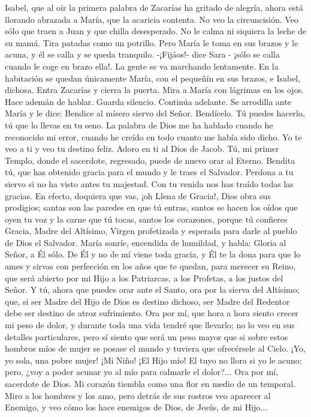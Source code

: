 \documentclass[12pt]{book} %
\begin{document}
Isabel, que al oír la primera palabra de Zacarías ha gritado de alegría, ahora está llorando abrazada a María, que la 
acaricia contenta. 
No veo la circuncisión. Veo sólo que traen a Juan y que chilla desesperado. No le calma ni siquiera la leche de su mamá. Tira patadas como un potrillo. Pero María le toma en sus brazos y le acuna, y él se calla y se queda tranquilo. 
-¡Fijáos!- dice Sara - ¡sólo se calla cuando le coge en brazo ella!. 
La gente se va marchando lentamente. En la habitación se quedan únicamente María, con el pequeñín en sus brazos, e Isabel, dichosa. 
Entra Zacarías y cierra la puerta. Mira a María con lágrimas en los ojos. Hace ademán de hablar. Guarda silencio. Continúa adelante. Se arrodilla ante María y le dice: 
Bendice al mísero siervo del Señor. Bendícelo. Tú puedes hacerlo, tú que lo llevas en tu seno. La palabra de Dios me ha hablado cuando he reconocido mi error, cuando he creído en todo cuanto me había sido dicho. Yo te veo a ti y veo tu destino feliz. Adoro en ti al Dios de Jacob. Tú, mi primer Templo, donde el sacerdote, regresado, puede de nuevo orar al Eterno. Bendita tú, que has obtenido gracia para el mundo y le traes el Salvador. Perdona a tu siervo si no ha visto antes tu majestad. Con tu venida nos has traído todas las gracias. En efecto, doquiera que vas, ¡oh Llena de Gracia!, Dios obra sus prodigios; santas son las paredes en que tú entras, santos se hacen los oídos que oyen tu voz y la carne que tú tocas, santos los corazones, porque tú confieres Gracia, Madre del Altísimo, Virgen profetizada y esperada para darle al pueblo de Dios el Salvador. 
María sonríe, encendida de humildad, y habla: 
Gloria al Señor, a Él sólo. De Él y no de mí viene toda gracia, y Él te la dona para que lo ames y sirvas con perfección en 
los años que te quedan, para merecer su Reino, que será abierto por mi Hijo a los Patriarcas, a los Profetas, a los justos del Señor. Y tú, ahora que puedes orar ante el Santo, ora por la sierva del Altísimo; que, si ser Madre del Hijo de Dios es destino dichoso, ser Madre del Redentor debe ser destino de atroz sufrimiento. Ora por mí, que hora a hora siento crecer mi peso de dolor, y durante toda una vida tendré que llevarlo; no lo veo en sus detalles particulares, pero sí siento que será un peso mayor que si sobre estos hombros míos de mujer se posase el mundo y tuviera que ofrecérsele al Cielo. ¡Yo, yo sola, una pobre mujer! ¡Mi Niño! ¡El Hijo mío! El tuyo no llora si yo le acuno; pero, ¿voy a poder acunar yo al mío para calmarle el dolor?... Ora por mí, sacerdote de Dios. Mi corazón tiembla como una flor en medio de un temporal. Miro a los hombres y los amo, pero detrás de sus rostros veo aparecer al Enemigo, y veo cómo los hace enemigos de Dios, de Jesús, de mi Hijo... 
\end{document}
